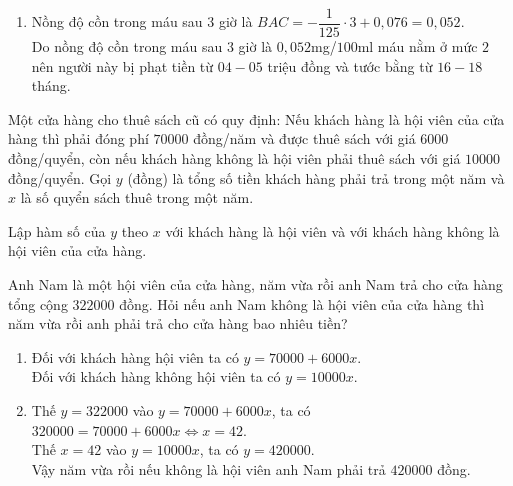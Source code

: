 \begin{bt}
{\begin{enumerate}
			      Từ đồ thị ta có hàm số đi qua các điểm $(0;0{,}076)$ và $(1;0{,}068)$ nên ta được
			      $\heva{& BAC=0{,}076 \\ & a=-\dfrac{1}{125}.}$\\
			      Công thức biểu thị mối quan hệ giữa nồng độ cồn trong máu $(BAC)$ sau $t$ giờ sử dụng là $BAC=-\dfrac{1}{125}t+0{,}076$.
			\item Nồng độ cồn trong máu sau $3$ giờ là $BAC=-\dfrac{1}{125}\cdot 3+0{,}076=0{,}052$.\\
			      Do nồng độ cồn trong máu sau $3$ giờ là $0{,}052$mg/$100$ml máu nằm ở mức $2$ nên người này bị phạt tiền từ $04-05$ triệu đồng  và tước bằng từ $16-18$ tháng.
		\end{enumerate}
	}
\end{bt}

\begin{bt}%
	Một cửa hàng cho thuê sách cũ có quy định: Nếu khách hàng là hội viên của cửa hàng thì phải đóng phí $70000$ đồng/năm và được thuê sách với giá $6000$ đồng/quyển, còn nếu khách hàng không là hội viên phải thuê sách với giá $10000$ đồng/quyển. Gọi $y$ (đồng) là tổng số tiền khách hàng phải trả trong một năm và $x$ là số quyển sách thuê trong một năm.
	\begin{listEX}
		\item Lập hàm số của $y$ theo $x$ với khách hàng là hội viên và với khách hàng không là hội viên của cửa hàng.
		\item Anh Nam là một hội viên của cửa hàng, năm vừa rồi anh Nam trả cho cửa hàng tổng cộng
		$322000$ đồng. Hỏi nếu anh Nam không là hội viên của cửa hàng thì năm vừa rồi anh phải trả
		cho cửa hàng bao nhiêu tiền?
	\end{listEX}
	\loigiai
	{
		\begin{enumerate}
			\item Đối với khách hàng hội viên ta có $y=70000+6000x$.\\
			      Đối với khách hàng không hội viên ta có $y=10000x$.
			\item Thế $y=322000$ vào $y=70000+6000x$, ta có $320000=70000+6000x \Leftrightarrow x=42$.\\
			      Thế $x=42$ vào $y=10000x$, ta có $y=420000$.\\
			      Vậy năm vừa rồi nếu không là hội viên anh Nam phải trả $420000$ đồng.
		\end{enumerate}
	}
\end{bt}

